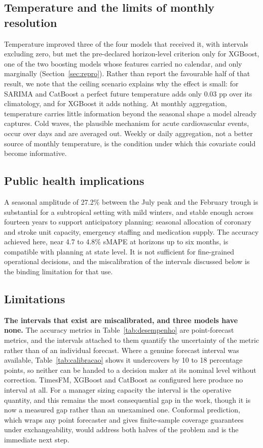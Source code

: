 \subsection{Temperature and the limits of monthly resolution}

Temperature improved three of the four models that received it, with intervals excluding
zero, but met the pre-declared horizon-level criterion only for XGBoost, one of the two
boosting models whose features carried no calendar, and only marginally (Section~\ref{sec:repro}). Rather than
report the favourable half of that result, we note that the ceiling scenario explains why the
effect is small: for SARIMA and CatBoost a perfect future temperature adds only 0.03 pp over
its climatology, and for XGBoost it adds nothing. At monthly aggregation, temperature
carries little information beyond the seasonal shape a model already captures. Cold waves,
the plausible mechanism for acute cardiovascular events, occur over days and are averaged
out. Weekly or daily aggregation, not a better source of monthly temperature, is the
condition under which this covariate could become informative.

\subsection{Public health implications}

A seasonal amplitude of 27.2\% between the July peak and the February trough is substantial
for a subtropical setting with mild winters, and stable enough across fourteen years to
support anticipatory planning: seasonal allocation of coronary and stroke unit capacity,
emergency staffing and medication supply. The accuracy achieved here, near 4.7 to 4.8\%
sMAPE at horizons up to six months, is compatible with planning at state level. It is not
sufficient for fine-grained operational decisions, and the miscalibration of the intervals
discussed below is the binding limitation for that use.

\subsection{Limitations}

\textbf{The intervals that exist are miscalibrated, and three models have none.} The
accuracy metrics in Table~\ref{tab:desempenho} are point-forecast metrics, and the intervals
attached to them quantify the uncertainty of the metric rather than of an individual
forecast. Where a genuine forecast interval was available, Table~\ref{tab:calibracao} shows
it undercovers by 10 to 18 percentage points, so neither can be handed to a decision maker
at its nominal level without correction. TimesFM, XGBoost and CatBoost as configured here
produce no interval at all. For a manager sizing capacity the interval is the operative
quantity, and this remains the most consequential gap in the work, though it is now a
measured gap rather than an unexamined one. Conformal prediction, which wraps any point
forecaster and gives finite-sample coverage guarantees under exchangeability, would address
both halves of the problem and is the immediate next step.

